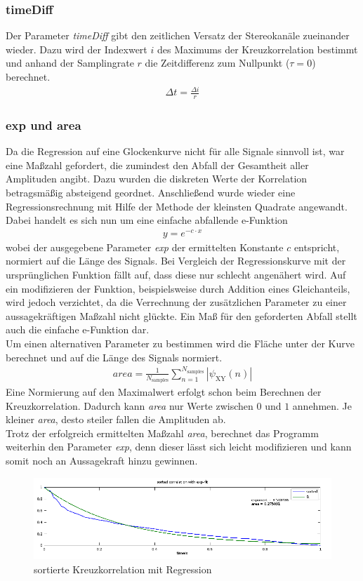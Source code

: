 \subsubsection{timeDiff}
Der Parameter \textit{timeDiff} gibt den zeitlichen Versatz der Stereokanäle zueinander wieder. Dazu wird der Indexwert $i$ des Maximums der Kreuzkorrelation bestimmt und anhand der Samplingrate $r$ die Zeitdifferenz zum Nullpunkt ($\tau = 0$) berechnet.
\begin{align*}
\Delta t = \frac{\Delta i}{r}
\end{align*}
\subsubsection{exp und area}
Da die Regression auf eine Glockenkurve nicht für alle Signale sinnvoll ist, war eine Maßzahl gefordert, die zumindest den Abfall der Gesamtheit aller Amplituden angibt. Dazu wurden die diskreten Werte der Korrelation betragsmäßig absteigend geordnet. Anschließend wurde wieder eine Regressionsrechnung mit Hilfe der Methode der kleinsten Quadrate angewandt. Dabei handelt es sich nun um eine einfache abfallende e-Funktion
\begin{align*}
y = e^{-c \cdot x}
\end{align*}
wobei der ausgegebene Parameter \textit{exp} der ermittelten Konstante $c$ entspricht, normiert auf die Länge des Signals. Bei Vergleich der Regressionskurve mit der ursprünglichen Funktion fällt auf, dass diese nur schlecht angenähert wird. Auf ein modifizieren der Funktion, beispielsweise durch Addition eines Gleichanteils, wird jedoch verzichtet, da die Verrechnung der zusätzlichen Parameter zu einer aussagekräftigen Maßzahl nicht glückte. Ein Maß für den geforderten Abfall stellt auch die einfache e-Funktion dar. 
\\Um einen alternativen Parameter zu bestimmen wird die Fläche unter der Kurve berechnet und auf die Länge des Signals normiert. 
\begin{align*}
area = \frac{1}{N_{\text{samples}}} \sum_{n=1}^{N_{\text{samples}}} |\psi_{\text{XY}}(n)|
\end{align*}
Eine Normierung auf den Maximalwert erfolgt schon beim Berechnen der Kreuzkorrelation. Dadurch kann \textit{area} nur Werte zwischen $0$ und $1$ annehmen. Je kleiner \textit{area}, desto steiler fallen die Amplituden ab. 
\\Trotz der erfolgreich ermittelten Maßzahl \textit{area}, berechnet das Programm weiterhin den Parameter \textit{exp}, denn dieser lässt sich leicht modifizieren und kann somit noch an Aussagekraft hinzu gewinnen. 
\begin{figure}[ht!]
  \centering
  \includegraphics[width=\textwidth, keepaspectratio=true]{img/trefftz_wiese_m_8(s)+1s_exp}
  \caption{sortierte Kreuzkorrelation mit Regression}
\label{exp-Regression}
\end{figure}
